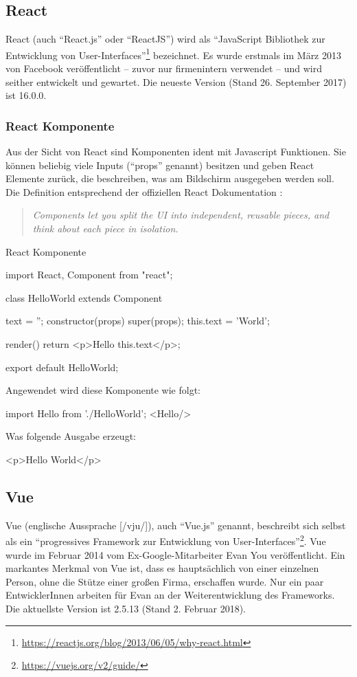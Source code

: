 \subsection{React}
React (auch "`React.js"' oder "`ReactJS"') wird als "`JavaScript Bibliothek zur Entwicklung von User-Interfaces"'\footnote{\url{https://reactjs.org/blog/2013/06/05/why-react.html}} bezeichnet. Es wurde erstmals im März 2013 von Facebook veröffentlicht -- zuvor nur firmenintern verwendet -- und wird seither entwickelt und gewartet. Die neueste Version (Stand 26. September 2017) ist 16.0.0.

\subsubsection{React Komponente}
Aus der Sicht von React sind Komponenten ident mit Javascript Funktionen. Sie können beliebig viele Inputs ("`props"' genannt) besitzen und geben React Elemente zurück, die beschreiben, was am Bildschirm ausgegeben werden soll.
Die Definition entsprechend der offiziellen React Dokumentation \cite{react-component}: 
\begin{quote}
	\begin{english}
		\textit{Components let you split the UI into independent, reusable pieces, and think about each piece in isolation.}
	\end{english}
\end{quote}

\begin{program}[!htbp]
\caption{React Komponente}
\begin{JsCode}
	import React, {Component} from "react";
	
	class HelloWorld extends Component {
		text = '';
		constructor(props) {
			super(props);
			this.text = 'World';
		}
		
		render() {
			return <p>Hello {this.text}</p>;
		}
	}
	export default HelloWorld;
\end{JsCode}
\end{program}
Angewendet wird diese Komponente wie folgt:
\begin{JsCode}[numbers=none]
import Hello from './HelloWorld';
<Hello/>
\end{JsCode}

Was folgende Ausgabe erzeugt:
\begin{JsCode}[numbers=none]
<p>Hello World</p>
\end{JsCode}

\subsection{Vue }
Vue (englische Aussprache [/vju/]), auch "`Vue.js"' genannt, beschreibt sich selbst als ein "`progressives Framework zur Entwicklung von User-Interfaces"'\footnote{\url{https://vuejs.org/v2/guide/}}. Vue wurde im Februar 2014 vom Ex-Google-Mitarbeiter Evan You veröffentlicht. Ein markantes Merkmal von Vue ist, dass es hauptsächlich von einer einzelnen Person, ohne die Stütze einer großen Firma, erschaffen wurde. Nur ein paar EntwicklerInnen arbeiten für Evan an der Weiterentwicklung des Frameworks. Die aktuellste Version ist 2.5.13 (Stand 2. Februar 2018).

